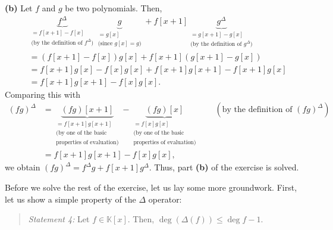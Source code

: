 \documentclass[paper=a4, fontsize=12pt]{scrartcl}%
\theoremstyle{plainsl}
\theoremstyle{definition}
\theoremstyle{remark}
\newenvironment{statement}{\begin{quote}}{\end{quote}}
\begin{document}
\textbf{(b)} Let $f$ and $g$ be two polynomials. Then,%
\begin{align*}
&  \underbrace{f^{\Delta}}_{\substack{=f\left[  x+1\right]  -f\left[
x\right]  \\\text{(by the definition of }f^{\Delta}\text{)}}}\underbrace{g}%
_{\substack{=g\left[  x\right]  \\\text{(since }g\left[  x\right]  =g\text{)}%
}}+f\left[  x+1\right]  \underbrace{g^{\Delta}}_{\substack{=g\left[
x+1\right]  -g\left[  x\right]  \\\text{(by the definition of }g^{\Delta
}\text{)}}}\\
&  =\left(  f\left[  x+1\right]  -f\left[  x\right]  \right)  g\left[
x\right]  +f\left[  x+1\right]  \left(  g\left[  x+1\right]  -g\left[
x\right]  \right) \\
&  =f\left[  x+1\right]  g\left[  x\right]  -f\left[  x\right]  g\left[
x\right]  +f\left[  x+1\right]  g\left[  x+1\right]  -f\left[  x+1\right]
g\left[  x\right] \\
&  =f\left[  x+1\right]  g\left[  x+1\right]  -f\left[  x\right]  g\left[
x\right]  .
\end{align*}
Comparing this with%
\begin{align*}
\left(  fg\right)  ^{\Delta}  &  =\underbrace{\left(  fg\right)  \left[
x+1\right]  }_{\substack{=f\left[  x+1\right]  g\left[  x+1\right]
\\\text{(by one of the basic}\\\text{properties of evaluation)}}%
}-\underbrace{\left(  fg\right)  \left[  x\right]  }_{\substack{=f\left[
x\right]  g\left[  x\right]  \\\text{(by one of the basic}\\\text{properties
of evaluation)}}}\qquad\left(  \text{by the definition of }\left(  fg\right)
^{\Delta}\right) \\
&  =f\left[  x+1\right]  g\left[  x+1\right]  -f\left[  x\right]  g\left[
x\right]  ,
\end{align*}
we obtain $\left(  fg\right)  ^{\Delta}=f^{\Delta}g+f\left[  x+1\right]
g^{\Delta}$. Thus, part \textbf{(b)} of the exercise is solved.

\bigskip

Before we solve the rest of the exercise, let us lay some more groundwork.
First, let us show a simple property of the $\Delta$ operator:

\begin{statement}
\textit{Statement 4:} Let $f\in\mathbb{\mathbb{K}}\left[  x\right]  $. Then,
$\deg\left(  \Delta\left(  f\right)  \right)  \leq\deg f-1$.
\end{statement}
\end{document}
